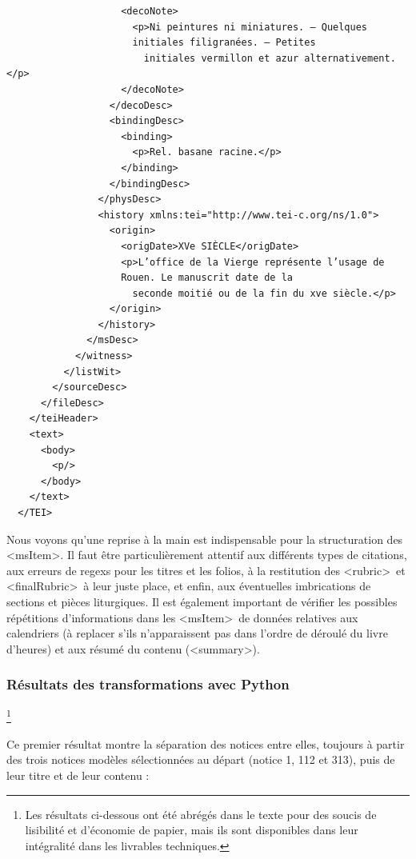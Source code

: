 \documentclass[a4paper,12pt,twoside]{book}
\begin{document}
\begin{verbatim}
                    <decoNote>
                      <p>Ni peintures ni miniatures. — Quelques 
                      initiales filigranées. — Petites
                        initiales vermillon et azur alternativement.</p>
                    </decoNote>
                  </decoDesc>
                  <bindingDesc>
                    <binding>
                      <p>Rel. basane racine.</p>
                    </binding>
                  </bindingDesc>
                </physDesc>
                <history xmlns:tei="http://www.tei-c.org/ns/1.0">
                  <origin>
                    <origDate>XVe SIÈCLE</origDate>
                    <p>L’office de la Vierge représente l’usage de
                    Rouen. Le manuscrit date de la
                      seconde moitié ou de la fin du xve siècle.</p>
                  </origin>
                </history>
              </msDesc>
            </witness>
          </listWit>
        </sourceDesc>
      </fileDesc>
    </teiHeader>
    <text>
      <body>
        <p/>
      </body>
    </text>
  </TEI>
	\end{verbatim}
	
	Nous voyons qu'une reprise à la main est indispensable pour la structuration des \textless msItem\textgreater . Il faut être particulièrement attentif aux différents types de citations, aux erreurs de regexs pour les titres et les folios, à la restitution des \textless rubric\textgreater~et \textless finalRubric\textgreater~à leur juste place, et enfin, aux éventuelles imbrications de sections et pièces liturgiques. Il est également important de vérifier les possibles répétitions d'informations dans les \textless msItem\textgreater~de données relatives aux calendriers (à replacer s'ils n'apparaissent pas dans l'ordre de déroulé du livre d'heures) et aux résumé du contenu (\textless summary\textgreater).
	
	\subsubsection{\label{resultats_python}Résultats des transformations avec Python}\footnote{Les résultats ci-dessous ont été abrégés dans le texte pour des soucis de lisibilité et d'économie de papier, mais ils sont disponibles dans leur intégralité dans les livrables techniques.}
	
	Ce premier résultat montre la séparation des notices entre elles, toujours à partir des trois notices modèles sélectionnées au départ (notice 1, 112 et 313), puis de leur titre et de leur contenu : 
\end{document}
